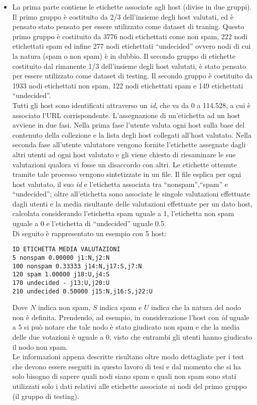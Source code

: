 \begin{itemize}
 \item La prima parte contiene le etichette associate agli host (divise in due gruppi). Il primo gruppo è costituito da 2/3 dell'insieme degli host valutati, ed è pensato stato pensato per essere utilizzato come dataset di traning. Questo primo gruppo è costituito da 3776 nodi etichettati come non spam, 222 nodi etichettati spam ed infine 277 nodi etichettati ``undecided'' ovvero nodi di cui la natura (spam o non spam) è in dubbio. Il secondo gruppo di etichette costituito dal rimanente 1/3 dell'insieme degli host valutati, è stato pensato per essere utilizzato come dataset di testing. Il secondo gruppo è costituito da 1933 nodi etichettati non spam, 122 nodi etichettati spam e 149 etichettati ``undecided''. \\ Tutti gli host sono identificati attraverso un \textit{id}, che va da 0 a 114.528, a cui è associato l'URL corrispondente.
 L'assegnazione di un'etichetta ad un host avviene in due fasi. Nella prima fase l'utente valuta ogni host sulla base del contenuto della collezione e la lista degli host collegati all'host valutato. Nella seconda fase all'utente valutatore vengono fornite l'etichette  assegnate dagli altri utenti ad ogni host valutato e gli viene chiesto di riesaminare le sue valutazioni qualora vi fosse un disaccordo con altri. Le etichette ottenute tramite tale processo vengono sintetizzate in un file. Il file esplica per ogni host valutato, il suo \textit{id}  e l'etichetta associata tra ``nonspam'',``spam'' e ``undecided''; oltre all'etichetta sono associate le singole valutazioni effettuate dagli utenti e la media risultante delle valutazioni effettuate per un dato host, calcolata considerando l'etichetta spam uguale a 1, l'etichetta non spam  uguale a 0 e l'etichetta di ``undecided'' uguale 0.5.\\
Di seguito è rappresentato un esempio con 5 host: 
 \begin{lstlisting}[frame=trbl,postbreak=\space, breakindent=5pt, breaklines]
ID ETICHETTA MEDIA VALUTAZIONI
5 nonspam 0.00000 j1:N,j2:N
100 nonspam 0.33333 j14:N,j17:S,j7:N
120 spam 1.00000 j18:U,j4:S
170 undecided - j13:U,j20:U
210 undecided 0.50000 j15:N,j16:S,j22:U
\end{lstlisting}
Dove \(N\) indica non spam, \(S\) indica spam e \(U\) indica che la natura del nodo non è definita. Prendendo, ad esempio, in considerazione l'host con \textit{id} uguale a 5 si può notare che tale nodo è stato giudicato non spam e che la media delle due votazioni è uguale a 0, visto che entrambi gli utenti hanno giudicato il nodo non spam.\\ 
Le informazioni appena descritte risultano oltre modo dettagliate per i test che devono essere eseguiti in questo lavoro di tesi e dal momento che si ha solo bisogno di sapere quali nodi siano spam e quali non spam sono stati utilizzati solo i dati relativi alle etichette associate ai nodi del primo gruppo (il gruppo di testing).


\end{itemize}
